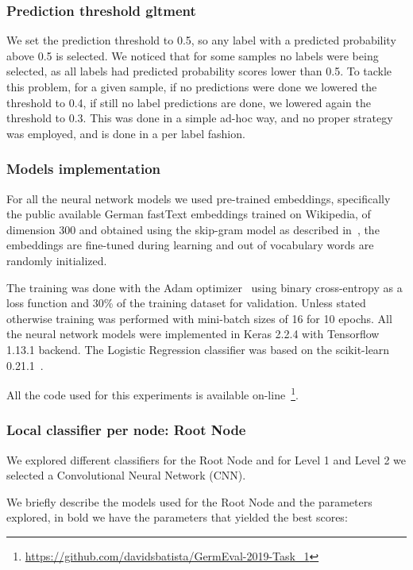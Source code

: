 \documentclass[11pt,a4paper]{article}
\begin{document}
\subsubsection{Prediction threshold gltment}\label{threshold}

We set the prediction threshold to 0.5, so any label with a predicted probability
above 0.5 is selected. We noticed that for some samples no labels were
being selected, as all labels had predicted probability scores lower than 0.5.
To tackle this problem, for a given sample, if no predictions were done we lowered
the threshold to 0.4, if still no label predictions are done, we lowered again
the threshold to 0.3. This was done in a simple ad-hoc way, and no proper strategy
was employed, and is done in a per label fashion.


\subsubsection{Models implementation}

For all the neural network models we used pre-trained embeddings, specifically
the public available German fastText embeddings trained on Wikipedia, of
dimension 300 and obtained using the skip-gram model as described
in~\citet{bojanowski-etal-2017-enriching}, the embeddings are fine-tuned
during learning and out of vocabulary words are randomly initialized.

The training was done with the Adam optimizer~\cite{journals/corr/KingmaB14}
using binary cross-entropy as a loss function and 30\% of the training
dataset for validation. Unless stated otherwise training was performed with
mini-batch sizes of 16 for 10 epochs. All the neural network models were
implemented in Keras 2.2.4 with Tensorflow 1.13.1 backend. The Logistic
Regression classifier was based on the scikit-learn
0.21.1~\cite{Pedregosa:2011:SML:1953048.2078195}.

All the code used for this experiments is available
on-line~\footnote{\url{https://github.com/davidsbatista/GermEval-2019-Task_1}}.


\subsubsection{Local classifier per node: Root Node}

We explored different classifiers for the Root Node and for Level 1 and Level 2
we selected a Convolutional Neural Network (CNN).

We briefly describe the models used for the Root Node and the parameters explored,
in bold we have the parameters that yielded the best scores:
\end{document}
